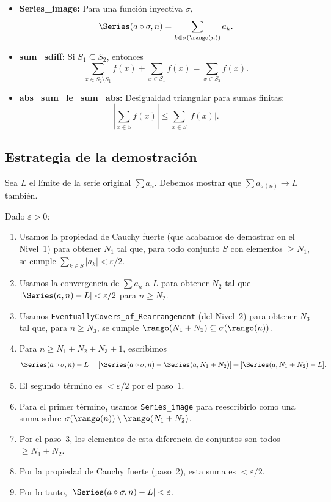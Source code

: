 \begin{itemize}
  \item \textbf{Series\_image:} Para una función inyectiva $\sigma$,
  \[
    \Series(a \circ \sigma, n) = \sum_{k \in \sigma(\rango(n))} a_k .
  \]
  \item \textbf{sum\_sdiff:} Si $S_1 \subseteq S_2$, entonces
  \[
    \sum_{x \in S_2 \setminus S_1} f(x) + \sum_{x \in S_1} f(x) = \sum_{x \in S_2} f(x).
  \]
  \item \textbf{abs\_sum\_le\_sum\_abs:} Desigualdad triangular para sumas finitas:
  \[
    \left| \sum_{x \in S} f(x) \right| \le \sum_{x \in S} |f(x)| .
  \]
\end{itemize}

\subsection{Estrategia de la demostración}

Sea $L$ el límite de la serie original $\sum a_n$. Debemos mostrar que $\sum a_{\sigma(n)} \to L$ también.

Dado $\varepsilon > 0$:
\begin{enumerate}
  \item Usamos la propiedad de Cauchy fuerte (que acabamos de demostrar en el Nivel~1) para obtener $N_1$ tal que, para todo conjunto $S$ con elementos $\ge N_1$, se cumple $\sum_{k \in S} |a_k| < \varepsilon/2$.
  \item Usamos la convergencia de $\sum a_n$ a $L$ para obtener $N_2$ tal que $|\Series(a, n) - L| < \varepsilon/2$ para $n \ge N_2$.
  \item Usamos \texttt{EventuallyCovers\_of\_Rearrangement} (del Nivel~2) para obtener $N_3$ tal que, para $n \ge N_3$, se cumple $\rango(N_1 + N_2) \subseteq \sigma(\rango(n))$.
  \item Para $n \ge N_1 + N_2 + N_3 + 1$, escribimos
  \[
    \Series(a \circ \sigma, n) - L = [\Series(a \circ \sigma, n) - \Series(a, N_1 + N_2)] + [\Series(a, N_1 + N_2) - L] .
  \]
  \item El segundo término es $< \varepsilon/2$ por el paso~1.
  \item Para el primer término, usamos \texttt{Series\_image} para reescribirlo como una suma sobre $\sigma(\rango(n)) \setminus \rango(N_1 + N_2)$.
  \item Por el paso~3, los elementos de esta diferencia de conjuntos son todos $\ge N_1 + N_2$.
  \item Por la propiedad de Cauchy fuerte (paso~2), esta suma es $< \varepsilon/2$.
  \item Por lo tanto, $|\Series(a \circ \sigma, n) - L| < \varepsilon$.
\end{enumerate}

